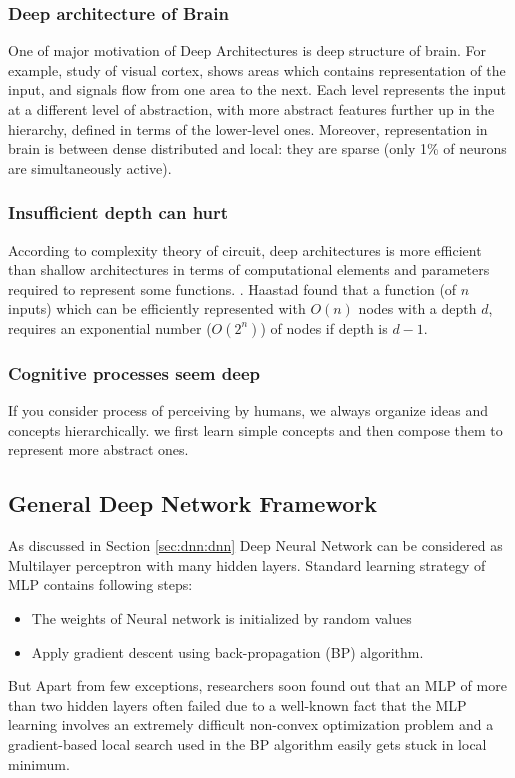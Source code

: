\subsubsection{Deep architecture of Brain}
One of major motivation of Deep Architectures is deep structure of brain. For example, study of visual cortex, shows areas which contains representation of the input, and signals flow from one area to the next. Each level represents the input at a different level of abstraction, with more abstract features further up in the hierarchy, defined in terms of the lower-level ones. Moreover, representation in brain is between dense distributed and local: they are sparse (only 1\% of neurons are simultaneously active). 

\subsubsection{Insufficient depth can hurt}
According to complexity theory of circuit, deep architectures is more efficient than shallow architectures in terms of computational elements and parameters required to represent some functions. \citep{bengio2007scaling}. Haastad found that a function (of $n$ inputs) which can be efficiently represented with $O(n)$ nodes with a depth $d$, requires an exponential number ($O(2^n)$) of nodes if depth is $d-1$. \citep{bengio2007greedy}

\subsubsection{Cognitive processes seem deep}
If you consider process of perceiving by humans, we always organize ideas and concepts hierarchically.  we first learn simple concepts and then compose them to represent more abstract ones. 


\subsection{General Deep Network Framework}
As discussed in Section \ref{sec:dnn:dnn} Deep Neural Network can be considered as Multilayer perceptron with many hidden layers. Standard learning strategy of MLP contains following steps:
\begin{itemize}
\item The weights of Neural network is initialized by random values
\item Apply gradient descent using back-propagation (BP) algorithm.
\end{itemize}
But Apart from few exceptions, researchers soon found out that an MLP of more
than two hidden layers often failed \cite{bengio2007greedy} due to a well-known fact that the MLP learning involves an extremely difficult non-convex optimization problem and a gradient-based local search used in the BP algorithm easily gets stuck in local minimum.

